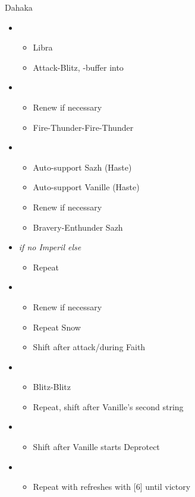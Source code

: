 \begin{battle}[1:30]{Dahaka}
		\begin{itemize}
			\item \second
			      \begin{itemize}
				      \item Libra
				      \item Attack-Blitz, \rav-buffer into
			      \end{itemize}
			\item \fifth
			      \begin{itemize}
				      \item Renew if necessary
				      \item Fire-Thunder-Fire-Thunder
			      \end{itemize}
			\item \first
			      \begin{itemize}
				      \item Auto-support Sazh (Haste)
				      \item Auto-support Vanille (Haste)
				      \item Renew if necessary
				      \item Bravery-Enthunder Sazh
			      \end{itemize}
			\item \fifth \textit{ if no Imperil else } \third
			      \begin{itemize}
				      \item Repeat
			      \end{itemize}
			\item \first
			      \begin{itemize}
				      \item Renew if necessary
				      \item Repeat Snow
				      \item Shift after attack/during Faith
			      \end{itemize}
			\item \second
			      \begin{itemize}
				      \item Blitz-Blitz
				      \item Repeat, shift after Vanille's second string
			      \end{itemize}
			\item \fifth
			      \begin{itemize}
				      \item Shift after Vanille starts Deprotect
			      \end{itemize}
			\item \fourth
			      \begin{itemize}
				      \item Repeat with refreshes with [6] until victory
			      \end{itemize}
		\end{itemize}
	\end{battle}


